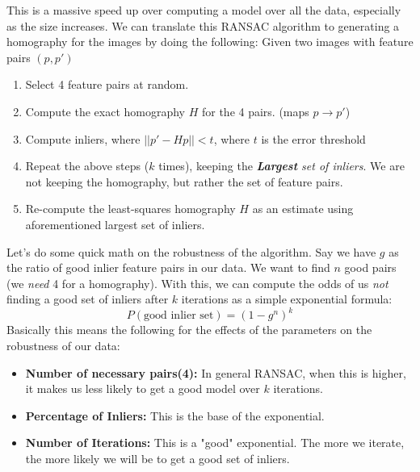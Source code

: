 \documentclass{article}
\begin{document}
This is a massive speed up over computing a model over all the data, especially as the size increases. We can translate this RANSAC algorithm to generating a homography for the images by doing the following: Given two images with feature pairs $(p,p')$
\newline
\begin{enumerate}
    \item Select 4 feature pairs at random.
    \item Compute the exact homography $H$ for the 4 pairs. (maps $p \rightarrow p'$)
    \item Compute inliers, where $||p' - Hp|| < t$, where $t$ is the error threshold
    \item Repeat the above steps ($k$ times), keeping the \textit{\textbf{Largest} set of inliers}. We are not keeping the homography, but rather the set of feature pairs.
    \item Re-compute the least-squares homography $H$ as an estimate using aforementioned largest set of inliers.
\end{enumerate}
Let's do some quick math on the robustness of the algorithm. Say we have $g$ as the ratio of good inlier feature pairs in our data. We want to find $n$ good pairs (we \textit{need} 4 for a homography). With this, we can compute the odds of us \textit{not} finding a good set of inliers after $k$ iterations as a simple exponential formula:
$$P(\text{good inlier set}) = (1 - g^n)^k$$
Basically this means the following for the effects of the parameters on the robustness of our data:
\begin{itemize}
    \item \textbf{Number of necessary pairs(4):} In general RANSAC, when this is higher, it makes us less likely to get a good model over $k$ iterations. 
    \item \textbf{Percentage of Inliers:} This is the base of the exponential.
    \item \textbf{Number of Iterations:} This is a "good" exponential. The more we iterate, the more likely we will be to get a good set of inliers. 
\end{itemize}
\end{document}

